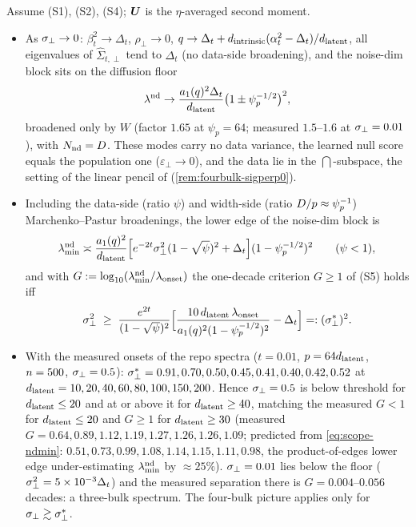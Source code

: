 \begin{proposition}\label{prop:scope-sigperp}
Assume (S1), (S2), (S4); $\bm{U}$ is the $\eta$-averaged second moment.
\begin{itemize}
\item[(i)] As $\sigma_{\perp}\to0$: $\beta_t^2\to\Delta_t$, $\rho_\perp\to0$, $q\to\Delta_t+d_{\mathrm{intrinsic}}(\alpha_t^2-\Delta_t)/d_{\mathrm{latent}}$, all eigenvalues of $\hat\Sigma_{t,\perp}$ tend to $\Delta_t$ (no data-side broadening), and the noise-dim block sits on the diffusion floor
\begin{equation}\label{eq:scope-floor}
\lambda^{\rm nd}\to\frac{a_1(q)^2\Delta_t}{d_{\mathrm{latent}}}\big(1\pm\psi_p^{-1/2}\big)^2,
\end{equation}
broadened only by $W$ (factor $1.65$ at $\psi_p=64$; measured $1.5$--$1.6$ at $\sigma_{\perp}=0.01$), with $N_{\rm nd}=D$. These modes carry no data variance, the learned null score equals the population one ($\varepsilon_\perp\to0$), and the data lie in the $\dint$-subspace, the setting of the linear pencil of \citet{george2025dsm} (\cref{rem:fourbulk-sigperp0}).
\item[(ii)] Including the data-side (ratio $\psi$) and width-side (ratio $D/p\approx\psi_p^{-1}$) Marchenko--Pastur broadenings, the lower edge of the noise-dim block is
\begin{equation}\label{eq:scope-ndmin}
\lambda^{\rm nd}_{\min}\asymp\frac{a_1(q)^2}{d_{\mathrm{latent}}}\Big[e^{-2t}\sigma_{\perp}^2(1-\sqrt\psi)^2+\Delta_t\Big](1-\psi_p^{-1/2})^2\qquad(\psi<1),
\end{equation}
and with $G:=\log_{10}(\lambda^{\rm nd}_{\min}/\lambda_{\rm onset})$ the one-decade criterion $G\ge1$ of (S5) holds iff
\begin{equation}\label{eq:scope-sigthr}
\sigma_{\perp}^2\;\ge\;\frac{e^{2t}}{(1-\sqrt\psi)^2}\Big[\frac{10\,d_{\mathrm{latent}}\,\lambda_{\rm onset}}{a_1(q)^2(1-\psi_p^{-1/2})^2}-\Delta_t\Big]=:(\sigma_{\perp}^*)^2 .
\end{equation}
\item[(iii)] With the measured onsets of the repo spectra ($t=0.01$, $p=64d_{\mathrm{latent}}$, $n=500$, $\sigma_{\perp}=0.5$): $\sigma_{\perp}^*=0.91,0.70,0.50,0.45,0.41,0.40,0.42,0.52$ at $d_{\mathrm{latent}}=10,20,40,60,80,100,150,200$. Hence $\sigma_{\perp}=0.5$ is below threshold for $d_{\mathrm{latent}}\le20$ and at or above it for $d_{\mathrm{latent}}\ge40$, matching the measured $G<1$ for $d_{\mathrm{latent}}\le20$ and $G\ge1$ for $d_{\mathrm{latent}}\ge30$ (measured $G=0.64,0.89,1.12,1.19,1.27,1.26,1.26,1.09$; predicted from \eqref{eq:scope-ndmin}: $0.51,0.73,0.99,1.08,1.14,1.15,1.11,0.98$, the product-of-edges lower edge under-estimating $\lambda^{\rm nd}_{\min}$ by $\approx25\%$). $\sigma_{\perp}=0.01$ lies below the floor ($\sigma_{\perp}^2=5\times10^{-3}\Delta_t$) and the measured separation there is $G=0.004$--$0.056$ decades: a three-bulk spectrum. The four-bulk picture applies only for $\sigma_{\perp}\gtrsim\sigma_{\perp}^*$.
\end{itemize}
\end{proposition}
